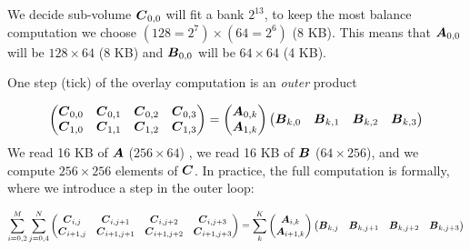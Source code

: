 \documentclass[journal]{IEEEtran}
\begin{document}
We decide sub-volume ${\boldsymbol C}_{0,0}$ will fit a bank $2^{13}$, to keep
the most balance computation we choose $(128=2^7) \times (64=2^6)$ (8
KB). This means that ${\boldsymbol A}_{0,0}$ will be $128 \times 64$ (8 KB) and
${\boldsymbol B}_{0,0}$ will be $64 \times 64$ (4 KB).

One step (tick) of the overlay computation is an {\em outer} product

{\small \begin{equation}
  \label{eq:gemmA}
  \begin{pmatrix}
    \Vc{C}_{0,0}  &  \Vc{C}_{0,1}  & \Vc{C}_{0,2}  &\Vc{C}_{0,3} \\
    \Vc{C}_{1,0}  & \Vc{C}_{1,1}   & \Vc{C}_{1,2}  & \Vc{C}_{1,3} \\
  \end{pmatrix}    =
  \begin{pmatrix}
    \Vc{A}_{0,k}  \\
    \Vc{A}_{1,k}   \\
  \end{pmatrix}  
  \begin{pmatrix}
    \Vc{B}_{k,0}  &  \Vc{B}_{k,1}  & \Vc{B}_{k,2}  &\Vc{B}_{k,3} \\
  \end{pmatrix}    
\end{equation}
} We read 16 KB of ${\boldsymbol A}$ ($256 \times 64$) , we read 16 KB of
${\boldsymbol B}$ ($64 \times 256$), and we compute $256 \times 256$ elements
of ${\boldsymbol C}$. In practice, the full computation is formally, where we
introduce a step in the outer loop:




{\small \begin{equation*}
    \sum_{i=0,2}^M
    \sum_{j=0,4}^N
  \begin{pmatrix}
    {\boldsymbol C}_{i,j}  & {\boldsymbol C}_{i,j+1}    & {\boldsymbol C}_{i,j+2}    &{\boldsymbol C}_{i,j+3} \\
    {\boldsymbol C}_{i+1,j}  & {\boldsymbol C}_{i+1,j+1}   & {\boldsymbol C}_{i+1,j+2}  & {\boldsymbol C}_{i+1,j+3} \\
  \end{pmatrix}    = \sum_k^K
  \begin{pmatrix}
    {\boldsymbol A}_{i,k}  \\
    {\boldsymbol A}_{i+1,k}   \\
  \end{pmatrix}  
  \begin{pmatrix}
    {\boldsymbol B}_{k,j}  &  {\boldsymbol B}_{k,j+1}  & {\boldsymbol B}_{k,j+2}  &{\boldsymbol B}_{k,j+3} \\
  \end{pmatrix}    
\end{equation*}
}
\end{document}
